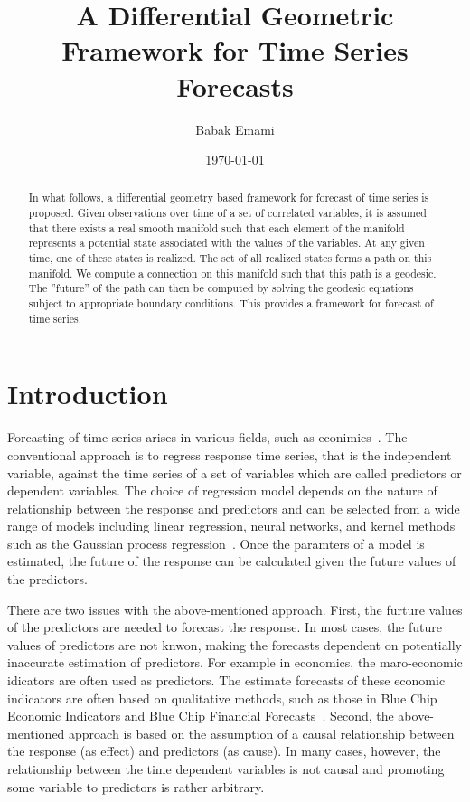\documentclass{article}
\title{A Differential Geometric Framework for Time Series Forecasts}
\author{Babak Emami}
\date{\today}
\begin{document}
\maketitle

\begin{abstract}

In what follows, a differential geometry based framework for forecast
of time series is proposed. Given observations over time of a set of
correlated variables, it is assumed that there exists a real smooth
manifold such that each element of the manifold represents a potential
state associated with the values of the variables. At any given time,
one of these states is realized. The set of all realized states forms
a path on this manifold. We compute a connection on this manifold such
that this path is a geodesic. The ''future'' of the path can then be
computed by solving the geodesic equations subject to appropriate
boundary conditions. This provides a framework for forecast of time
series.

\end{abstract}

\section{Introduction}\label{section:introduction}

Forcasting of time series arises in various fields, such as
econimics~\cite{kennedy-1998, fabozzi-2014}. The conventional approach
is to regress response time series, that is the independent variable,
against the time series of a set of variables which are called
predictors or dependent variables. The choice of regression model
depends on the nature of relationship between the response and
predictors and can be selected from a wide range of models including
linear regression, neural networks, and kernel methods such as the
Gaussian process regression~\cite{hastie-etal-2009,
  rasmussen-williams-2005}. Once the paramters of a model is
estimated, the future of the response can be calculated given the
future values of the predictors.

There are two issues with the above-mentioned approach. First, the
furture values of the predictors are needed to forecast the
response. In most cases, the future values of predictors are not
knwon, making the forecasts dependent on potentially inaccurate
estimation of predictors. For example in economics, the maro-economic
idicators are often used as predictors. The estimate forecasts of
these economic indicators are often based on qualitative methods, such
as those in Blue Chip Economic Indicators and Blue Chip Financial
Forecasts~\cite{ref:blue-chip}. Second, the above-mentioned approach
is based on the assumption of a causal relationship between the
response (as effect) and predictors (as cause). In many cases,
however, the relationship between the time dependent variables is not
causal and promoting some variable to predictors is rather arbitrary.
\end{document}

